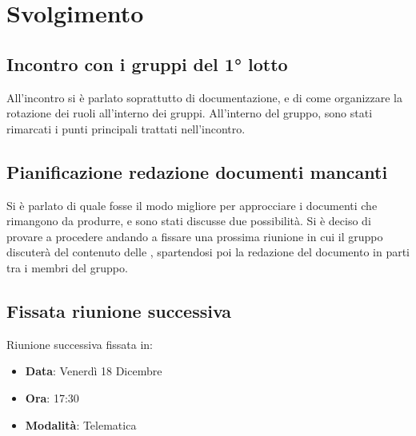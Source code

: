 \documentclass[]{article}
\begin{document}
	\newpage

	\section{Svolgimento}
		\subsection{Incontro con i gruppi del 1° lotto}
		All'incontro si è parlato soprattutto di documentazione, e di come organizzare la rotazione dei ruoli all'interno dei gruppi. All'interno del gruppo, sono stati rimarcati i punti principali trattati nell'incontro.

		\subsection{Pianificazione redazione documenti mancanti}
		Si è parlato di quale fosse il modo migliore per approcciare i documenti che rimangono da produrre, e sono stati discusse due possibilità.
		Si è deciso di provare a procedere andando a fissare una prossima riunione in cui il gruppo discuterà del contenuto delle , spartendosi poi la redazione del documento in parti tra i membri del gruppo.

		\subsection{Fissata riunione successiva}
		Riunione successiva fissata in:
		\begin{itemize}
			\item \textbf{Data}: Venerdì 18 Dicembre
			\item \textbf{Ora}: 17:30
			\item \textbf{Modalità}: Telematica
		\end{itemize}
\end{document}
